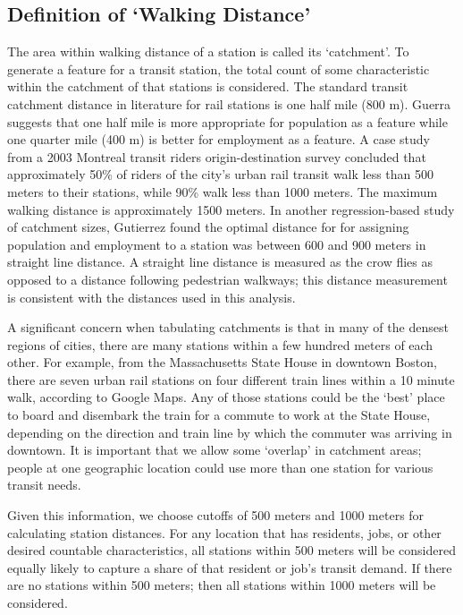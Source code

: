 \documentclass[11pt]{article}
\begin{document}
\subsection{Definition of `Walking Distance'}\label{sec:walk}

The area within walking distance of a station is called its `catchment'. To generate a feature for a transit station, the total count of some characteristic within the catchment of that stations is considered. The standard transit catchment distance in literature for rail stations is one half mile (800 m). Guerra \cite{Guerra2012} suggests that one half mile is more appropriate for population as a feature while one quarter mile (400 m) is better for employment as a feature. A case study \cite{ElGeneidy2014} from a 2003 Montreal transit riders origin-destination survey concluded that approximately 50\% of riders of the city's urban rail transit walk less than 500 meters to their stations, while 90\% walk less than 1000 meters. The maximum walking distance is approximately 1500 meters. In another regression-based study of catchment sizes, Gutierrez \cite{Gutierrez2011} found the optimal distance for  for assigning population and employment to a station was between 600 and 900 meters in straight line distance. A straight line distance is measured as the crow flies as opposed to a distance following pedestrian walkways; this distance measurement is consistent with the distances used in this analysis.

A significant concern when tabulating catchments is that in many of the densest regions of cities, there are many stations within a few hundred meters of each other. For example, from the Massachusetts State House in downtown Boston, there are seven urban rail stations on four different train lines within a 10 minute walk, according to Google Maps. Any of those stations could be the `best' place to board and disembark the train for a commute to work at the State House, depending on the direction and train line by which the commuter was arriving in downtown. It is important that we allow some `overlap' in catchment areas; people at one geographic location could use more than one station for various transit needs. 

Given this information, we choose cutoffs of 500 meters and 1000 meters for calculating station distances. For any location that has residents, jobs, or other desired countable characteristics, all stations within 500 meters will be considered equally likely to capture a share of that resident or job's transit demand. If there are no stations within 500 meters; then all stations within 1000 meters will be considered. 
\end{document}
